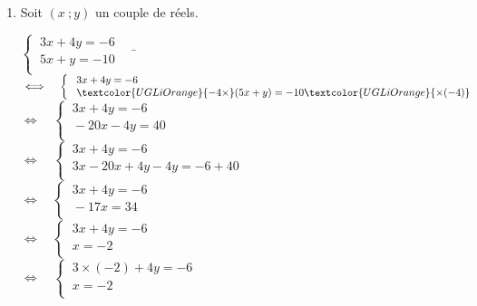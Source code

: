 \documentclass[a4paper,11pt,exos]{nsi} %
\begin{document}
\begin{enumerate}
    \item Soit $(x\ ;y)$ un couple de réels.
    \begin{tabbing}
        $\left\{
            \begin{array}{l}
                \ 3x+4y=-6 \\
				\ 5x+y=-10\\
            \end{array} \right. \quad$  \= $\iff\quad 
            \left\{
                \begin{array}{l}
                \ 3x+4y=-6 \\
				\ \textcolor{UGLiOrange}{-4\times}(5x+y)=-10\textcolor{UGLiOrange}{\times (-4)}\\
            \end{array} \right.$\\[.5em]

            \>  $\iff\quad \left\{
                \begin{array}{l}
                \ 3x+4y=-6 \\
                \ -20x-4y=40\\
            \end{array} \right.$\\[.5em]

            \>  $\iff\quad \left\{
                \begin{array}{l}
                \ 3x+4y=-6 \\
                \ 3x-20x+4y-4y=-6+40\\
            \end{array} \right.$\\[.5em]

            \>  $\iff\quad \left\{
                \begin{array}{l}
                \ 3x+4y=-6 \\
                \ -17x=34\\
            \end{array} \right.$\\[.5em]

            \>  $\iff\quad \left\{
                \begin{array}{l}
                \ 3x+4y=-6 \\
                \ x=-2\\
            \end{array} \right.$\\[.5em]

            \>  $\iff\quad \left\{
                \begin{array}{l}
                \ 3\times(-2)+4y=-6 \\
                \ x=-2\\
            \end{array} \right.$\\[.5em]


\end{tabbing}
\end{enumerate}
\end{document}
